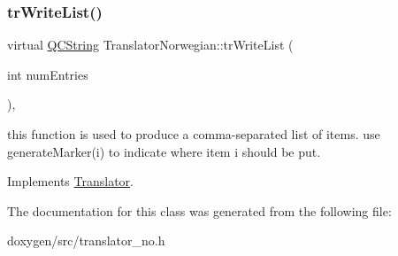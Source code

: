 \subsubsection{\texorpdfstring{trWriteList()}{trWriteList()}}
{\footnotesize\ttfamily virtual \mbox{\hyperlink{class_q_c_string}{Q\+C\+String}} Translator\+Norwegian\+::tr\+Write\+List (\begin{DoxyParamCaption}\item[{int}]{num\+Entries }\end{DoxyParamCaption})\hspace{0.3cm}{\ttfamily [inline]}, {\ttfamily [virtual]}}

this function is used to produce a comma-\/separated list of items. use generate\+Marker(i) to indicate where item i should be put. 

Implements \mbox{\hyperlink{class_translator}{Translator}}.



The documentation for this class was generated from the following file\+:\begin{DoxyCompactItemize}
\item 
doxygen/src/translator\+\_\+no.\+h\end{DoxyCompactItemize}
